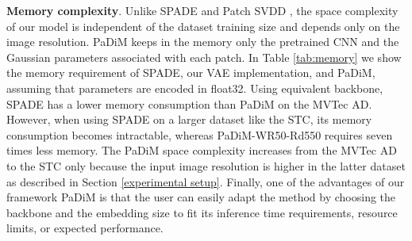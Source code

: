 \documentclass[a4paper,conference]{IEEEtran}
\begin{document}
\textbf{Memory complexity}. Unlike SPADE \cite{cohen2020subimage} and Patch SVDD \cite{yi2020patch}, the space complexity of our model is independent  of the dataset training size and depends only on the image resolution. PaDiM  keeps in the memory only the pretrained CNN and the Gaussian parameters associated with each patch. In Table \ref{tab:memory} we show the memory requirement of SPADE, our VAE implementation, and PaDiM, assuming that parameters are encoded in float32.
Using equivalent backbone, SPADE has a lower memory consumption than PaDiM on the MVTec AD. However, when using SPADE on a larger dataset like the STC, its memory consumption becomes intractable, whereas  PaDiM-WR50-Rd550 requires seven times less memory. The PaDiM space complexity increases from the MVTec AD to the STC only because the input image resolution is higher in the latter dataset as described in Section \ref{experimental setup}.
Finally, one of the advantages of our framework PaDiM is that the user can easily adapt the method by choosing the backbone and the embedding size to fit its inference time requirements, resource limits, or expected performance.

\begin{table}[!ht]
\centering
\caption{Memory requirement in Gb of the anomaly localization methods trained on the MVTec AD and the STC dataset. }

\label{tab:memory}
\end{table}
\end{document}
